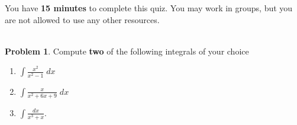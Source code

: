 \documentclass[12pt]{article}
\theoremstyle{plain}
\theoremstyle{definition}
\newtheorem{problem}[exercise]{Problem}
\theoremstyle{remark}
\begin{document}
\author{TA: \href{mailto:\authoremail}{\documentauthor}}
\title{\documenttitle}
\date{\today}
\maketitle

You have \textbf{15 minutes} to complete this quiz. You may work in groups,
but you are not allowed to use any other resources.
\\\\
\begin{problem}
Compute \textbf{two} of the following integrals of your choice
\begin{enumerate}[label=(\alph*)]
\item $\displaystyle\int\frac{x^2}{x^2-1}\;dx$
\item $\displaystyle\int\frac{x}{x^2+6x+9}\;dx$
\item $\displaystyle\int\frac{dx}{x^3+x}.$
\end{enumerate}
\end{problem}
\end{document}
